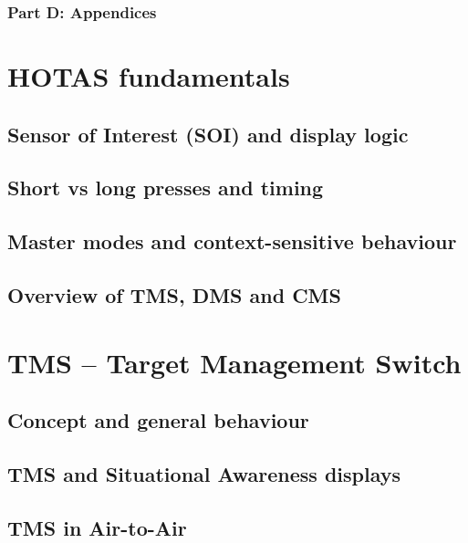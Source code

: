\documentclass[11pt,a4paper]{article}
\begin{document}
\subsubsection{Part D: Appendices}


\section{HOTAS fundamentals}

\subsection{Sensor of Interest (SOI) and display logic}

\subsection{Short vs long presses and timing}

\subsection{Master modes and context-sensitive behaviour}

\subsection{Overview of TMS, DMS and CMS}


\section{TMS -- Target Management Switch}

\subsection{Concept and general behaviour}

\subsection{TMS and Situational Awareness displays}

\subsection{TMS in Air-to-Air}
\end{document}
